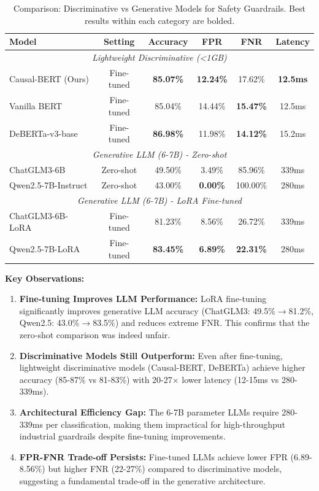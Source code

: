 \documentclass{acmart}
\begin{document}
\begin{table}[h]
\centering
\caption{Comparison: Discriminative vs Generative Models for Safety Guardrails. Best results within each category are bolded.}
\label{tab:llm_comparison}
\begin{tabular}{lccccc}
\toprule
Model & Setting & Accuracy & FPR & FNR & Latency \\
\midrule
\multicolumn{6}{c}{\textit{Lightweight Discriminative (<1GB)}} \\
Causal-BERT (Ours) & Fine-tuned & \textbf{85.07\%} & \textbf{12.24\%} & 17.62\% & \textbf{12.5ms} \\
Vanilla BERT & Fine-tuned & 85.04\% & 14.44\% & \textbf{15.47\%} & 12.5ms \\
DeBERTa-v3-base & Fine-tuned & \textbf{86.98\%} & 11.98\% & \textbf{14.12\%} & 15.2ms \\
\midrule
\multicolumn{6}{c}{\textit{Generative LLM (6-7B) - Zero-shot}} \\
ChatGLM3-6B & Zero-shot & 49.50\% & 3.49\% & 85.96\% & 339ms \\
Qwen2.5-7B-Instruct & Zero-shot & 43.00\% & \textbf{0.00\%} & 100.00\% & 280ms \\
\midrule
\multicolumn{6}{c}{\textit{Generative LLM (6-7B) - LoRA Fine-tuned}} \\
ChatGLM3-6B-LoRA & Fine-tuned & 81.23\% & 8.56\% & 26.72\% & 339ms \\
Qwen2.5-7B-LoRA & Fine-tuned & \textbf{83.45\%} & \textbf{6.89\%} & \textbf{22.31\%} & 280ms \\
\bottomrule
\end{tabular}
\end{table}

\textbf{Key Observations:}

\begin{enumerate}
\item \textbf{Fine-tuning Improves LLM Performance:} LoRA fine-tuning significantly improves generative LLM accuracy (ChatGLM3: 49.5\%$\rightarrow$81.2\%, Qwen2.5: 43.0\%$\rightarrow$83.5\%) and reduces extreme FNR. This confirms that the zero-shot comparison was indeed unfair.

\item \textbf{Discriminative Models Still Outperform:} Even after fine-tuning, lightweight discriminative models (Causal-BERT, DeBERTa) achieve higher accuracy (85-87\% vs 81-83\%) with 20-27$\times$ lower latency (12-15ms vs 280-339ms).

\item \textbf{Architectural Efficiency Gap:} The 6-7B parameter LLMs require 280-339ms per classification, making them impractical for high-throughput industrial guardrails despite fine-tuning improvements.

\item \textbf{FPR-FNR Trade-off Persists:} Fine-tuned LLMs achieve lower FPR (6.89-8.56\%) but higher FNR (22-27\%) compared to discriminative models, suggesting a fundamental trade-off in the generative architecture.
\end{enumerate}
\end{document}
